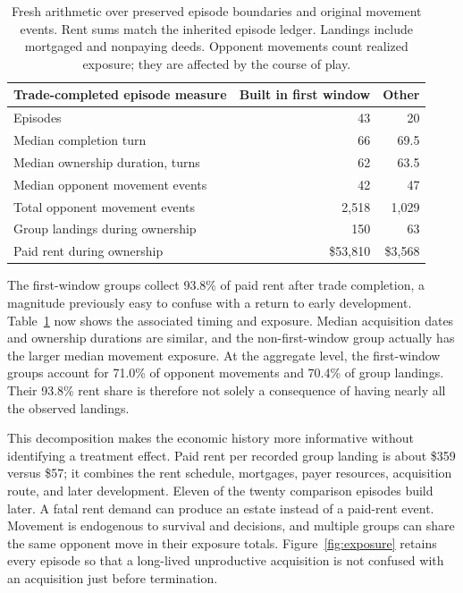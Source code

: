 \begin{table}[t]
\centering\small
\begin{tabular}{@{}lrr@{}}\toprule
Trade-completed episode measure & Built in first window & Other\\\midrule
Episodes & 43 & 20\\
Median completion turn & 66 & 69.5\\
Median ownership duration, turns & 62 & 63.5\\
Median opponent movement events & 42 & 47\\
Total opponent movement events & 2,518 & 1,029\\
Group landings during ownership & 150 & 63\\
Paid rent during ownership & \$53,810 & \$3,568\\\bottomrule
\end{tabular}
\caption{Fresh arithmetic over preserved episode boundaries and original movement events. Rent sums match the inherited episode ledger. Landings include mortgaged and nonpaying deeds. Opponent movements count realized exposure; they are affected by the course of play.}
\label{tab:exposure}
\end{table}

The first-window groups collect 93.8\% of paid rent after trade completion, a magnitude previously easy to confuse with a return to early development. Table~\ref{tab:exposure} now shows the associated timing and exposure. Median acquisition dates and ownership durations are similar, and the non-first-window group actually has the larger median movement exposure. At the aggregate level, the first-window groups account for 71.0\% of opponent movements and 70.4\% of group landings. Their 93.8\% rent share is therefore not solely a consequence of having nearly all the observed landings.

This decomposition makes the economic history more informative without identifying a treatment effect. Paid rent per recorded group landing is about \$359 versus \$57; it combines the rent schedule, mortgages, payer resources, acquisition route, and later development. Eleven of the twenty comparison episodes build later. A fatal rent demand can produce an estate instead of a paid-rent event. Movement is endogenous to survival and decisions, and multiple groups can share the same opponent move in their exposure totals. Figure~\ref{fig:exposure} retains every episode so that a long-lived unproductive acquisition is not confused with an acquisition just before termination.

